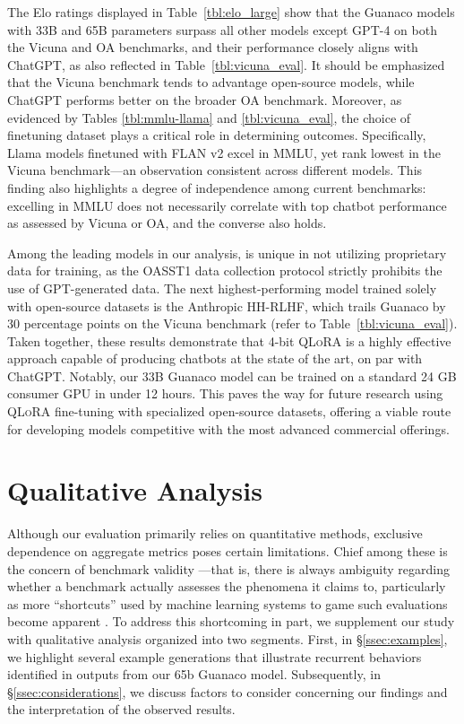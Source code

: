 The Elo ratings displayed in Table~\ref{tbl:elo_large} show that the {Guanaco} models with 33B and 65B parameters surpass all other models except GPT-4 on both the Vicuna and OA benchmarks, and their performance closely aligns with ChatGPT, as also reflected in Table~\ref{tbl:vicuna_eval}. It should be emphasized that the Vicuna benchmark tends to advantage open-source models, while ChatGPT performs better on the broader OA benchmark. Moreover, as evidenced by Tables \ref{tbl:mmlu-llama} and \ref{tbl:vicuna_eval}, the choice of finetuning dataset plays a critical role in determining outcomes. Specifically, Llama models finetuned with FLAN v2 excel in MMLU, yet rank lowest in the Vicuna benchmark—an observation consistent across different models. This finding also highlights a degree of independence among current benchmarks: excelling in MMLU does not necessarily correlate with top chatbot performance as assessed by Vicuna or OA, and the converse also holds.

Among the leading models in our analysis,  is unique in not utilizing proprietary data for training, as the OASST1 data collection protocol strictly prohibits the use of GPT-generated data. The next highest-performing model trained solely with open-source datasets is the Anthropic HH-RLHF, which trails {Guanaco} by 30 percentage points on the Vicuna benchmark (refer to Table~\ref{tbl:vicuna_eval}). Taken together, these results demonstrate that 4-bit \textsc{QLoRA} is a highly effective approach capable of producing chatbots at the state of the art, on par with ChatGPT. Notably, our 33B {Guanaco} model can be trained on a standard 24 GB consumer GPU in under 12 hours. This paves the way for future research using \textsc{QLoRA} fine-tuning with specialized open-source datasets, offering a viable route for developing models competitive with the most advanced commercial offerings.

\section{Qualitative Analysis}

Although our evaluation primarily relies on quantitative methods, exclusive dependence on aggregate metrics poses certain limitations. Chief among these is the concern of benchmark validity \citep{liao2021we}—that is, there is always ambiguity regarding whether a benchmark actually assesses the phenomena it claims to, particularly as more ``shortcuts'' used by machine learning systems to game such evaluations become apparent \citep{gururangan2018annotation, poliak2018hypothesis}. To address this shortcoming in part, we supplement our study with qualitative analysis organized into two segments. First, in \S\ref{ssec:examples}, we highlight several example generations that illustrate recurrent behaviors identified in outputs from our 65b {Guanaco} model. Subsequently, in \S\ref{ssec:considerations}, we discuss factors to consider concerning our findings and the interpretation of the observed results.

